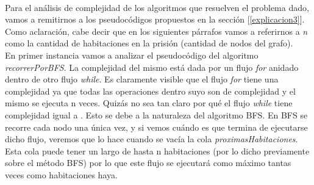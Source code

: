\paragraph{}
Para el análisis de complejidad de los algoritmos que resuelven el problema dado, vamos a remitirnos a los pseudocódigos propuestos en la sección [\ref{explicacion3}]. Como aclaración, cabe decir que en los siguientes párrafos vamos a referirnos a \textit{n} como la cantidad de habitaciones en la prisión (cantidad de nodos del grafo).\\
En primer instancia vamos a analizar el pseudocódigo del algoritmo \textit{recorrerPorBFS}. La complejidad del mismo está dada por un flujo \textit{for} anidado dentro de otro flujo \textit{while}. Es claramente visible que el flujo \textit{for} tiene una complejidad  ya que todas las operaciones dentro suyo son de complejidad  y el mismo se ejecuta n veces. Quizás no sea tan claro por qué el flujo \textit{while} tiene complejidad igual a . Esto se debe a la naturaleza del algoritmo BFS. En BFS se recorre cada nodo una única vez, y si vemos cuándo es que termina de ejecutarse dicho flujo, veremos que lo hace cuando se vacía la cola \textit{proximasHabitaciones}. Esta cola puede tener un largo de hasta n habitaciones (por lo dicho previamente sobre el método BFS) por lo que este flujo se ejecutará como máximo tantas veces como habitaciones haya.

